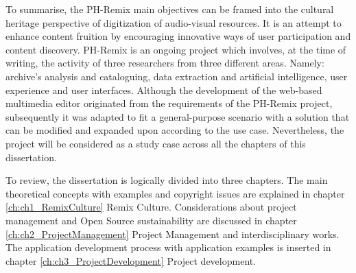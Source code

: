 To summarise, the PH-Remix main objectives can be framed into the cultural heritage perspective of digitization of audio-visual resources. It is an attempt to enhance content fruition by encouraging innovative ways of user participation and content discovery. PH-Remix is an ongoing project which involves, at the time of writing, the activity of three researchers from three different areas. Namely: archive’s analysis and cataloguing, data extraction and artificial intelligence, user experience and user interfaces.
Although the development of the web-based multimedia editor originated from the requirements of the PH-Remix project, subsequently it was adapted to fit a general-purpose scenario with a solution that can be modified and expanded upon according to the use case. Nevertheless, the project will be considered as a study case across all the chapters of this dissertation.

To review, the dissertation is logically divided into three chapters.
The main theoretical concepts with examples and copyright issues are explained in chapter \ref{ch:ch1_RemixCulture} Remix Culture.
Considerations about project management and Open Source sustainability are discussed in chapter \ref{ch:ch2_ProjectManagement} Project Management and interdisciplinary works.
The application development process with application examples is inserted in chapter \ref{ch:ch3_ProjectDevelopment} Project development.

